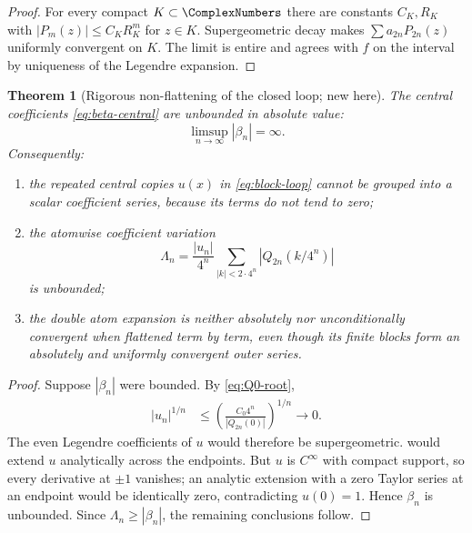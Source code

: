 \documentclass[11pt]{article}
\newtheorem{theorem}{Theorem}[section]
\theoremstyle{definition}
\theoremstyle{remark}
\begin{document}
\begin{proof}
For every compact $K\subset\ComplexNumbers$ there are constants $C_K,R_K$ with
$|P_m(z)|\le C_KR_K^m$ for $z\in K$.  Supergeometric decay makes
$\sum a_{2n}P_{2n}(z)$ uniformly convergent on $K$.  The limit is entire and
agrees with $f$ on the interval by uniqueness of the Legendre expansion.
\end{proof}

\begin{theorem}[Rigorous non-flattening of the closed loop; new here]
\label{thm:nonflattening}
The central coefficients \eqref{eq:beta-central} are unbounded in absolute
value:
\begin{equation}
 \boxed{\limsup_{n\to\infty}|\beta_n|=\infty.}
 \label{eq:beta-unbounded}
\end{equation}
Consequently:
\begin{enumerate}
  \item the repeated central copies $u(x)$ in \eqref{eq:block-loop} cannot be
  grouped into a scalar coefficient series, because its terms do not tend to
  zero;
  \item the atomwise coefficient variation
  \begin{equation}
   \Lambda_n=\frac{|u_n|}{4^n}
   \sum_{|k|<2\cdot4^n}|Q_{2n}(k/4^n)|
   \label{eq:block-variation}
  \end{equation}
  is unbounded;
  \item the double atom expansion is neither absolutely nor unconditionally
  convergent when flattened term by term, even though its finite blocks form
  an absolutely and uniformly convergent outer series.
\end{enumerate}
\end{theorem}

\begin{proof}
Suppose $|\beta_n|$ were bounded.  By \eqref{eq:Q0-root},
\begin{align*}
 |u_n|^{1/n}
 &\le \left(\frac{C_0 4^n}{|Q_{2n}(0)|}\right)^{1/n}
 \longrightarrow0.
\end{align*}
The even Legendre coefficients of $u$ would therefore be supergeometric.
 would extend $u$ analytically across the
endpoints.  But $u$ is $C^\infty$ with compact support, so every derivative at
$\pm1$ vanishes; an analytic extension with a zero Taylor series at an endpoint
would be identically zero, contradicting $u(0)=1$.  Hence $\beta_n$ is
unbounded.  Since $\Lambda_n\ge|\beta_n|$, the remaining conclusions follow.
\end{proof}
\end{document}
